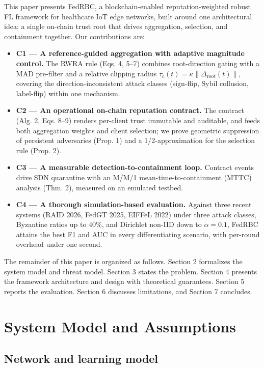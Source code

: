 \documentclass[cmc,article,submit,moreauthors,pdftex]{Definitions/tsp}
\begin{document}
This paper presents FedRBC, a blockchain-enabled reputation-weighted robust FL framework for healthcare IoT edge networks, built around one architectural idea: a single on-chain trust root that drives aggregation, selection, and containment together. Our contributions are:

\begin{itemize}
\item \textbf{C1 --- A reference-guided aggregation with adaptive magnitude control.} The RWRA rule (Eqs. 4, 5--7) combines root-direction gating with a MAD pre-filter and a relative clipping radius $\tau_c(t) = \kappa\|\Delta_{\mathrm{root}}(t)\|$, covering the direction-inconsistent attack classes (sign-flip, Sybil collusion, label-flip) within one mechanism.
\item \textbf{C2 --- An operational on-chain reputation contract.} The contract (Alg. 2, Eqs. 8--9) renders per-client trust immutable and auditable, and feeds both aggregation weights and client selection; we prove geometric suppression of persistent adversaries (Prop. 1) and a 1/2-approximation for the selection rule (Prop. 2).
\item \textbf{C3 --- A measurable detection-to-containment loop.} Contract events drive SDN quarantine with an M/M/1 mean-time-to-containment (MTTC) analysis (Thm. 2), measured on an emulated testbed.
\item \textbf{C4 --- A thorough simulation-based evaluation.} Against three recent systems (RAID 2026, FedGT 2025, EIFFeL 2022) under three attack classes, Byzantine ratios up to 40\%, and Dirichlet non-IID down to $\alpha=0.1$, FedRBC attains the best F1 and AUC in every differentiating scenario, with per-round overhead under one second.
\end{itemize}

The remainder of this paper is organized as follows. Section 2 formalizes the system model and threat model. Section 3 states the problem. Section 4 presents the framework architecture and design with theoretical guarantees. Section 5 reports the evaluation. Section 6 discusses limitations, and Section 7 concludes.

\section{System Model and Assumptions}\label{sec:system-model-and-assumptions}

\subsection{Network and learning model}\label{sec:network-and-learning-model}
\end{document}
